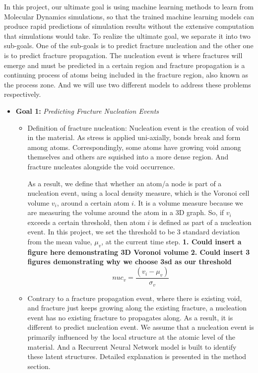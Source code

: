 In this project, our ultimate goal is using machine learning methods to learn from Molecular Dynamics simulations, so that the trained machine learning models can produce rapid predictions of simulation results without the extensive computation that simulations would take. To realize the ultimate goal, we separate it into two sub-goals. One of the sub-goals is to predict fracture nucleation and the other one is to predict fracture propagation. The nucleation event is where fractures will emerge and must be predicted in a certain region and fracture propagation is a continuing process of atoms being included in the fracture region, also known as the process zone. And we will use two different models to address these problems respectively. 



\begin{itemize}
\item \textbf{Goal 1:} \emph{Predicting Fracture Nucleation Events} 
\begin{itemize} 
    \item Definition of fracture nucleation: Nucleation event is the creation of void in the material. As stress is applied uni-axially, bonds break and form among atoms. Correspondingly, some atoms have growing void among themselves and others are squished into a more dense region. And fracture nucleates alongside the void occurrence. 
    
    As a result, we define that whether an atom/a node is part of a nucleation event, using a local density measure, which is the Voronoi cell volume $v_i$, around a certain atom $i$. It is a volume measure because we are measuring the volume around the atom in a 3D graph. 
    So, if $v_i$ exceeds a certain threshold, then atom $i$ is defined as part of a nucleation event. In this project, we set the threshold to be 3 standard deviation from the mean value, $\mu_v$, at the current time step.
    \textbf{1. Could insert a figure here demonstrating 3D Voronoi volume}
    \textbf{2. Could insert 3 figures demonstrating why we choose 3sd as our threshold}
    \[
    nuc_v = \frac{(v_i - \mu_v)}{\sigma_v}
    \]  
    \item Contrary to a fracture propagation event, where there is existing void, and fracture just keeps growing along the existing fracture, a nucleation event has no existing fracture to propagates along. As a result, it is different to predict nucleation event. We assume that a nucleation event is primarily influenced by the local structure at the atomic level of the material. And a Recurrent Neural Network model is built to identify these latent structures. Detailed explanation is presented in the method section.
    
\end{itemize}
\end{itemize}


